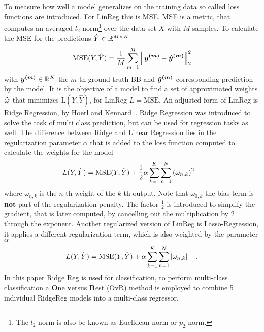 To measure how well a model generalizes on the training data so called \hyperref[subsec:losses]{loss functions} are introduced.
For LinReg this is \hyperref[eq:mse]{MSE}.
MSE is a metric, that computes an averaged $l_2$-norm\footnote{
    The $l_2$-norm is also be known as Euclidean norm or $p_2$-norm.
}
over the data set $X$ with $M$ samples.
To calculate the MSE for the predictions  ${\hat{Y}}\in\mathbb{R}^{M\times K}$
\begin{align}
    \text{MSE}({Y}, {\hat{Y}}) = \frac{1}{M} \sum \limits_{m=1}^M
      \left\lVert\bm{y^{(m)}}-\bm{\hat{y}^{(m)}}\right\rVert_2^2
    \label{eq:mse}
\end{align}
with $\bm{y^{(m)}}\in\mathbb{R}^K$ the $m$-th ground truth BB and $\bm{\hat{y}^{(m)}}$ corresponding prediction by the model.
It is the objective of a model to find a set of approximated weights $\bm{\hat{\omega}}$ that minimizes $\text{L}({Y}, {\hat{Y}})$, for LinReg $L = \text{MSE}$.\newline
An adjusted form of LinReg is Ridge Regression, by Hoerl and Kennard~\cite{RidgeRegression}. Ridge Regression was introduced to solve the task of multi class prediction, but can be used for regression tasks as well.
The difference between Ridge and Linear Regression lies in the regularization parameter $\alpha$ that is added to the loss function computed to calculate the weights for the model
\begin{align}
    L(Y, \hat{Y}) &= \text{MSE}(Y, \hat{Y}) + \frac{1}{2}\alpha
    \sum\limits_{k=1}^{K}
    \sum\limits_{n=1}^N
    \left(\omega_{n,k}\right)^2
    \label{eq:ridge-loss}
\end{align}
where $\omega_{n,k}$ is the $n$-th weight of the $k$-th output. Note that $\omega_{0, k}$ the bias term is \textbf{not} part of the regularization penalty.
The factor $\frac{1}{2}$ is introduced to simplify the gradient, that is later computed, by cancelling out the multiplication by $2$ through the exponent.
Another regularized version of LinReg is Lasso-Regression\cite{handsOn}, it applies a different regularization term, which is also weighted by the parameter $\alpha$
\begin{align}
    L(Y, \hat{Y}) = \text{MSE}(Y, \hat{Y})
    + \alpha
    \sum \limits_{k=1}^K
    \sum \limits_{n=1}^N
    \left|\omega_{n,k}\right|
    \quad .
    \label{eq:lasso-loss}
\end{align}
In this paper Ridge Reg is used for classification, to perform multi-class classification a \textbf{O}ne \textbf{v}ersus \textbf{R}est (OvR) method is employed to combine 5 individual RidgeReg models into a multi-class regressor.
